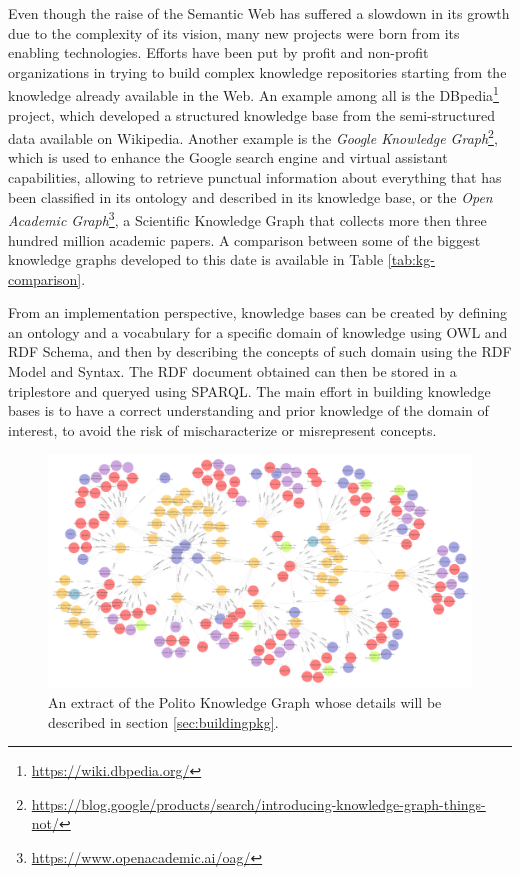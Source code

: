 \documentclass[%
    corpo=13.5pt,
    twoside,
    oldstyle,
    tipotesi=magistrale,
    greek,
    evenboxes
]{toptesi}
\begin{document}
Even though the raise of the Semantic Web has suffered a slowdown in its growth
due to the complexity of its vision, many new projects were born from its
enabling technologies. Efforts have been put by profit and
non-profit organizations in trying to build complex knowledge repositories
starting from the knowledge already available in the Web. An example among all
is the DBpedia\footnote{\url{https://wiki.dbpedia.org/}} project, which
developed a structured knowledge base from the semi-structured data available on
Wikipedia.
Another example is the
\emph{Google Knowledge Graph}\footnote{\url{https://blog.google/products/search/introducing-knowledge-graph-things-not/}},
which is used to enhance the Google search engine and virtual assistant
capabilities, allowing to retrieve punctual information about everything that
has been classified in its ontology and described in its knowledge base, or
the \emph{Open Academic Graph}\footnote{\url{https://www.openacademic.ai/oag/}},
a Scientific Knowledge Graph that collects more then three hundred million
academic papers. A comparison between some of the biggest knowledge graphs
developed to this date is available in Table \ref{tab:kg-comparison}.

From an implementation perspective, knowledge bases can be created by defining
an ontology and a vocabulary for a specific domain of knowledge using OWL and
RDF Schema, and then by describing the concepts of such domain using the
RDF Model and Syntax.
The RDF document obtained can then be stored in a triplestore and queryed
using SPARQL.
The main effort in building knowledge bases is to have a correct understanding
and prior knowledge of the domain of interest, to avoid the risk of
mischaracterize or misrepresent concepts.

\begin{figure}[h]
    \centering
    \includegraphics[scale=0.4]{img/geranium-knowledge-base-example.png}
    \caption{An extract of the Polito Knowledge Graph whose details will be
    described in section \ref{sec:buildingpkg}.}
    \label{fig:geranium-knowledge-base-example}
\end{figure}
\end{document}
